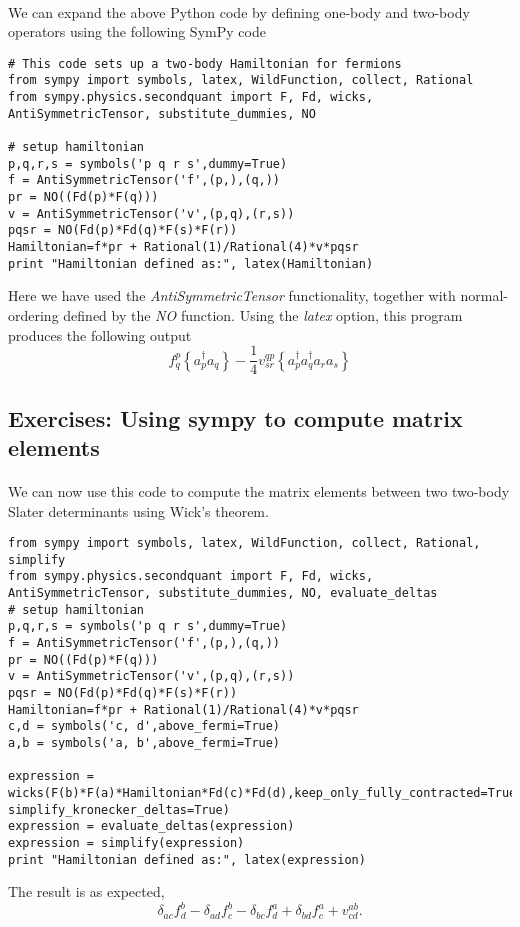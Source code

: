 \documentclass[%
twoside,                 %
final,                   %
10pt]{article}
\begin{document}
\paragraph{}
We can expand the above Python code by defining one-body and two-body operators using  the following SymPy code 
\begin{verbatim}
# This code sets up a two-body Hamiltonian for fermions
from sympy import symbols, latex, WildFunction, collect, Rational
from sympy.physics.secondquant import F, Fd, wicks, AntiSymmetricTensor, substitute_dummies, NO

# setup hamiltonian
p,q,r,s = symbols('p q r s',dummy=True)
f = AntiSymmetricTensor('f',(p,),(q,))
pr = NO((Fd(p)*F(q)))
v = AntiSymmetricTensor('v',(p,q),(r,s))
pqsr = NO(Fd(p)*Fd(q)*F(s)*F(r))
Hamiltonian=f*pr + Rational(1)/Rational(4)*v*pqsr
print "Hamiltonian defined as:", latex(Hamiltonian)
\end{verbatim}
Here we have used the \emph{AntiSymmetricTensor} functionality, together with normal-ordering defined by the \emph{NO} function. 
Using the \emph{latex} option, this program produces the following output
\[
f^{p}_{q} \left\{a^\dagger_{p} a_{q}\right\} - \frac{1}{4} v^{qp}_{sr} \left\{a^\dagger_{p} a^\dagger_{q} a_{r} a_{s}\right\}
\]




\subsection*{Exercises: Using sympy to compute matrix elements}

\paragraph{}
We can now use this code to compute the matrix elements between two two-body Slater determinants using Wick's theorem.
\begin{verbatim}
from sympy import symbols, latex, WildFunction, collect, Rational, simplify
from sympy.physics.secondquant import F, Fd, wicks, AntiSymmetricTensor, substitute_dummies, NO, evaluate_deltas
# setup hamiltonian
p,q,r,s = symbols('p q r s',dummy=True)
f = AntiSymmetricTensor('f',(p,),(q,))
pr = NO((Fd(p)*F(q)))
v = AntiSymmetricTensor('v',(p,q),(r,s))
pqsr = NO(Fd(p)*Fd(q)*F(s)*F(r))
Hamiltonian=f*pr + Rational(1)/Rational(4)*v*pqsr
c,d = symbols('c, d',above_fermi=True)
a,b = symbols('a, b',above_fermi=True)

expression = wicks(F(b)*F(a)*Hamiltonian*Fd(c)*Fd(d),keep_only_fully_contracted=True, simplify_kronecker_deltas=True)
expression = evaluate_deltas(expression)
expression = simplify(expression)
print "Hamiltonian defined as:", latex(expression)
\end{verbatim}
The result is as expected,
\[
\delta_{a c} f^{b}_{d} - \delta_{a d} f^{b}_{c} - \delta_{b c} f^{a}_{d} + \delta_{b d} f^{a}_{c} + v^{ab}_{cd}.
\]
\end{document}
